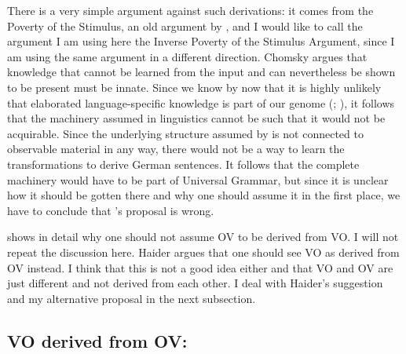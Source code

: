 \noindent
There is a very simple argument against such derivations: it comes from the Poverty of the
Stimulus, an old argument by \citet[]{Chomsky80b-u}, and I would like to call the argument I
am using here the Inverse Poverty of the Stimulus Argument, since I am using the same argument in a
different direction. Chomsky argues that knowledge that cannot be learned from the
input and can nevertheless be shown to be present must be innate. Since we know by now that it is
highly unlikely that elaborated language-specific knowledge is part of our genome
(\citealt*{HCF2002a}; \cites{Bishop2002a}[Section~6.4.2.2]{Dabrowska2004a}{FM2005a}), it follows that
the machinery assumed in linguistics cannot be such that it would not be acquirable. Since the
underlying structure assumed by \citeauthor{Laenzlinger2004a} is not connected to observable
material in any way, there would not be a way to learn the transformations to derive German
sentences. It follows that the complete machinery would have to be part of Universal Grammar, but
since it is unclear how it should be gotten there and why one should assume it in the first place,
we have to conclude that \citeauthor{Kayne94a-u}'s proposal is wrong.

\citet{Haider2000a} shows in detail why one should not assume OV to be derived from VO. I will not
repeat the discussion here. Haider argues that one should see VO as derived from OV instead. I think
that this is not a good idea either and that VO and OV are just different and not derived from
each other. I deal with Haider's suggestion and my alternative proposal in the next subsection.



\subsection{VO derived from OV: \citet{Haider2020a}}
\label{sec-vo-derived-from-ov}


